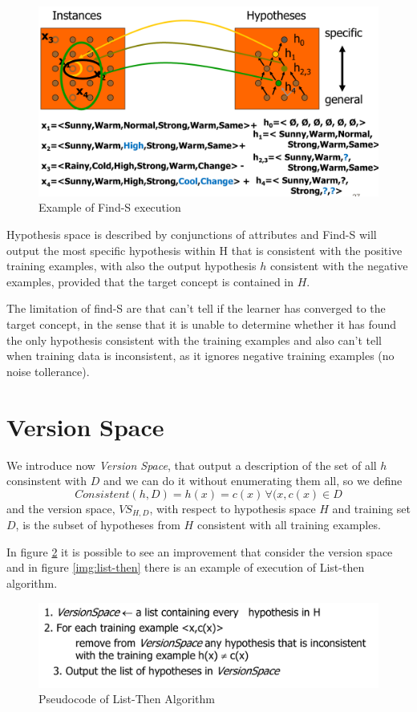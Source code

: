\begin{figure}
	\caption{Example of Find-S execution}
	\label{img:find-S}
	\includegraphics[width=\textwidth]{images/find-S-example}
\end{figure}
Hypothesis space is described by conjunctions of attributes and Find-S will output the most specific hypothesis within H that is consistent with the positive training examples,
with also the output hypothesis $h$ consistent with the negative examples, provided that the target concept is contained in $H$.

The limitation of find-S are that can’t tell if the learner has converged to the target concept, in the sense that it is unable to determine whether it has found the only hypothesis consistent
with the training examples and also can’t tell when training data is inconsistent, as it ignores negative training examples (no noise tollerance).

\section{Version Space}
We introduce now \emph{Version Space}, that output a description of the set of all $h$ consinstent with $D$ and we can do it without enumerating them all, so we define 
\[ Consistent(h,D) = h(x) = c(x) \, \forall (x, c(x) \in D \]
and the version space, $VS_{H, D}$, with respect to hypothesis space $H$ and training set $D$, is the subset of hypotheses from $H$ consistent with all training examples.

In figure \ref{alg:list-Then} it is possible to see an improvement that consider the version space and in figure \ref{img:list-then} there is an example of execution of List-then algorithm.

\begin{figure}
	\caption{Pseudocode of List-Then Algorithm}
	\label{alg:list-Then}
	\includegraphics[width=\textwidth]{images/list-then-pseudo}
\end{figure}

